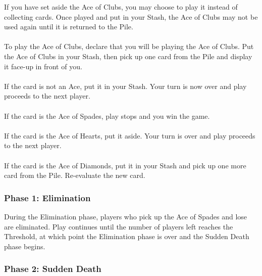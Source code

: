 \documentclass{article}
\begin{document}
If you have set aside the Ace of Clubs, you may choose to play it
instead of collecting cards. Once played and put in your Stash, the Ace
of Clubs may not be used again until it is returned to the Pile.

\paragraph{}
To play the Ace of Clubs, declare that you will be playing the Ace of
Clubs. Put the Ace of Clubs in your Stash, then pick up one card from
the Pile and display it face-up in front of you.

\paragraph{}
If the card is not an Ace, put it in your Stash. Your turn is now over
and play proceeds to the next player.

\paragraph{}
If the card is the Ace of Spades, play stops and you win the game.

\paragraph{}
If the card is the Ace of Hearts, put it aside. Your turn is over and
play proceeds to the next player.

\paragraph{}
If the card is the Ace of Diamonds, put it in your Stash and pick up one
more card from the Pile. Re-evaluate the new card.


\subsubsection{Phase 1: Elimination}
\label{sec:elimination}

During the Elimination phase, players who pick up the Ace of Spades and
lose are eliminated. Play continues until the number of players left
reaches the Threshold, at which point the Elimination phase is over and
the Sudden Death phase begins.

\subsubsection{Phase 2: Sudden Death}
\label{sec:sd}
\end{document}
